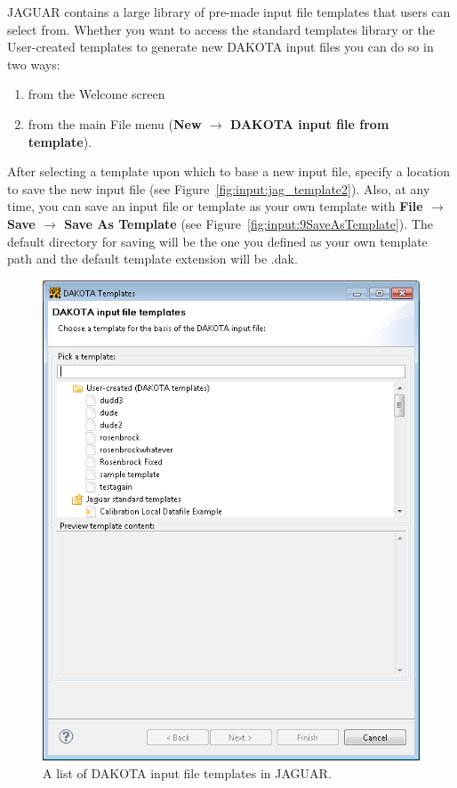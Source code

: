 JAGUAR contains a large library of pre-made input file templates that users can select 
from. Whether you want to access the standard templates library or the User-created templates  
to generate new DAKOTA input files you can do so in two ways:
\begin{enumerate}
\item from the Welcome screen 
\item from the main File menu ({\bf New $\rightarrow$ DAKOTA input file from template}). 
\end{enumerate}

After selecting a template upon which to base a new input file,
specify a location to save the new input file (see Figure~\ref{fig:input:jag_template2}).
Also, at any time, you can save an input file or template as your own template 
with {\bf File $\rightarrow$ Save $\rightarrow$ Save As Template} 
(see Figure~\ref{fig:input:9SaveAsTemplate}). The default directory for saving will be the one you defined as your own template path and the default template extension will be .dak. 
\begin{figure}
  \centering
  \includegraphics[scale=0.6]{images/2_1jag_template1}
  \caption{A list of DAKOTA input file templates in JAGUAR.}
  \label{fig:input:jag_template1}
\end{figure}
